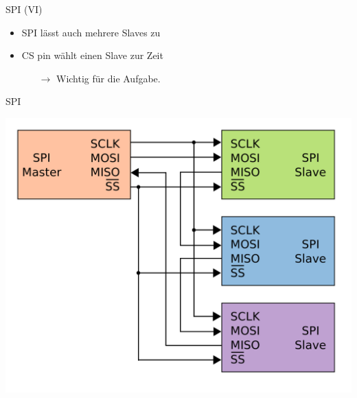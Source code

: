   \begin{frame} {SPI (VI)}
    \begin{block} {}
    \begin{itemize}
      \item SPI lässt auch mehrere Slaves zu
      \item CS pin wählt einen Slave zur Zeit
      \begin{itemize}
        \item[$\rightarrow$] Wichtig für die Aufgabe.
      \end{itemize}
    \end{itemize}
  \end{block}
  \end{frame}

  \begin{frame} {SPI}
    \begin{center}
      \includegraphics[height=.8\textheight]{SPI-daisychain}
    \end{center}
  \end{frame}

